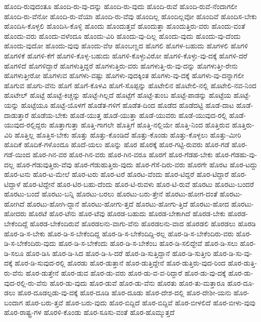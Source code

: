 {ಹೊಂದಿ-ರುವುದಂತೂ
ಹೊಂದಿ-ರು-ವು-ದನ್ನು
ಹೊಂದಿ-ರು-ವುದು
ಹೊಂದಿ-ರುವೆ
ಹೊಂದಿ-ರುವೆ-ನೆಂದಾಗಲೀ
ಹೊಂದಿ-ರು-ವೆನೋ
ಹೊಂದಿ-ರು-ವೆಯಾ
ಹೊಂದಿ-ರು-ವೆವು
ಹೊಂದಿಲ್ಲ
ಹೊಂದಿಲ್ಲವೋ
ಹೊಂದಿವೆ
ಹೊಂದಿಸ-ಬೇಕು
ಹೊಂದಿಸಿ-ಕೊಳ್ಳಲಿ
ಹೊಂದಿಸಿ-ಕೊಳ್ಳಿ
ಹೊಂದು
ಹೊಂದುತ್ತವೆ
ಹೊಂದುತ್ತಾ
ಹೊಂದುತ್ತಿರು-ವರು
ಹೊಂದು-ವಂತೆ
ಹೊಂದು-ವರು
ಹೊಂದು-ವಳೆಂದೂ
ಹೊಂದು-ವಿರಿ
ಹೊಂದು-ವು-ದಿಲ್ಲ
ಹೊಂದು-ವುದು
ಹೊಂದು-ವು-ದೆಂದು
ಹೊಂದು-ವುದೋ
ಹೊಂದು-ವುವು
ಹೊಂದು-ವೆಆ
ಹೊಂಬಣ್ಣದ
ಹೊಗಲಿ
ಹೊಗಳ-ಬಹುದು
ಹೊಗಳಲಿ
ಹೊಗಳಿ
ಹೊಗಳಿಕೆ
ಹೊಗಳಿ-ಕೆಗೆ
ಹೊಗಳಿ-ಕೊಳ್ಳ-ಬಹುದು
ಹೊಗಳಿ-ಕೊಳ್ಳುವಿರೋ
ಹೊಗಳಿ-ಕೊಳ್ಳು-ವು-ದಕ್ಕೆ
ಹೊಗಳಿ-ದರೆ
ಹೊಗಳಿದೆ
ಹೊಗಳಿದ್ದಾರೆ
ಹೊಗಳುತ್ತಿದ್ದರೆ
ಹೊಗಳುತ್ತಿರು-ವರು
ಹೊಗಳುತ್ತಿ-ರು-ವು-ದನ್ನು
ಹೊಗಳುತ್ತೀ-ರೇನು
ಹೊಗಳುತ್ತೀರೋ
ಹೊಗಳುವ
ಹೊಗಳು-ವಷ್ಟು
ಹೊಗಳು-ವುದಕ್ಕಿಂತ
ಹೊಗಳು-ವು-ದಕ್ಕೆ
ಹೊಗಳು-ವು-ದನ್ನಾಗಲೀ
ಹೊಗುವ
ಹೊಗು-ವೆನು
ಹೊಗೆ
ಹೊಗೆ-ಕೊಳವಿ
ಹೊಗೆ-ಸೊಪ್ಪನ್ನು
ಹೊಟೇಲಿನ
ಹೊಟೇಲಿ-ನಲ್ಲಿ
ಹೊಟೇಲಿ-ನವ-ನಿಂದ
ಹೊಟೇಲ್
ಹೊಟ್ಟೆ
ಹೊಟ್ಟೆ-ಕಿಚ್ಚನ್ನು
ಹೊಟ್ಟೆ-ಗಿಲ್ಲದೆ
ಹೊಟ್ಟೆಗೆ
ಹೊಟ್ಟೆ-ತುಂಬ
ಹೊಟ್ಟೆ-ಪಾಡನ್ನು
ಹೊಟ್ಟೆಯ
ಹೊಟ್ಟೆ-ಯನ್ನು
ಹೊಟ್ಟೆಯೂ
ಹೊಟ್ಟೆ-ಯೊಳಗೆ
ಹೊಡೆತ-ಗಳಿಗೆ
ಹೊಡೆತ-ದಿಂದ
ಹೊಡೆದ
ಹೊಡೆದಟ್ಟಿ
ಹೊಡೆ-ದಾಟ
ಹೊಡೆ-ದಾಡುತ್ತಾರೆ
ಹೊಡೆಯ-ಬೇಕು
ಹೊಡೆ-ಯುತ್ತ
ಹೊಡೆ-ಯುತ್ತಾ
ಹೊಡೆ-ಯುವರು
ಹೊಡೆ-ಯುವುದ-ರಲ್ಲಿ
ಹೊಡೆ-ಯುವುದ-ರಲ್ಲಿದ್ದರು
ಹೊತ್ತಾಗುತ್ತಾ
ಹೊತ್ತಿ-ಗಾಗಲೇ
ಹೊತ್ತಿಗೆ
ಹೊತ್ತಿ-ನಲ್ಲಿಯೇ
ಹೊತ್ತಿ-ನಿಂದ
ಹೊತ್ತಿರುವ
ಹೊತ್ತಿರು-ವಿರಿ
ಹೊತ್ತಿಲ್ಲ
ಹೊತ್ತಿಸ-ಬೇಕು
ಹೊತ್ತು
ಹೊತ್ತು-ಕೊಂಡಿದೆ
ಹೊತ್ತು-ಕೊಂಡು
ಹೊತ್ತು-ಕೊಳ್ಳಲು
ಹೊತ್ತು-ಮೀರಿ
ಹೊದಿಕೆ
ಹೊದಿಕೆ-ಗಳೊಂದೂ
ಹೊದೆ-ಯಲು
ಹೊನ್ನು
ಹೊರ
ಹೊರಕ್ಕೆ
ಹೊರ-ಗಟ್ಟಿ-ರುವರು
ಹೊರ-ಗಡೆ
ಹೊರ-ಗಡೆ-ಯಿಂದ
ಹೊರ-ಗಿನ-ವರ
ಹೊರ-ಗಿನ-ವರು
ಹೊರ-ಗಿನ-ವರೂ
ಹೊರಗೆ
ಹೊರ-ಗೆಡಹ-ಬೇಕು
ಹೊರ-ಗೆಡಹು-ವು-ದಲ್ಲ
ಹೊರ-ಗೆಡುವುತ್ತಿರು-ವೆವು
ಹೊರ-ಗೆಡುಹುತ್ತಿರು-ವುದು
ಹೊರ-ಗೆಸೆ-ದಿರು-ವರು
ಹೊರಗೇ
ಹೊರಟ
ಹೊರ-ಟದ್ದು
ಹೊರ-ಟನು
ಹೊರ-ಟ-ಮೇಲೆ
ಹೊರ-ಟರು
ಹೊರ-ಟರೆ
ಹೊರಟ-ವೆಂದು
ಹೊರ-ಟಿದ್ದರೆ
ಹೊರ-ಟಿದ್ದಾರೆ
ಹೊರ-ಟಿದ್ದಾಳೆ
ಹೊರ-ಟಿದ್ದೇನೆ
ಹೊರ-ಟಿರ-ಬಹು-ದೆಂದು
ಹೊರ-ಟಿ-ರುವಳು
ಹೊರ-ಟಿ-ರುವೆ
ಹೊರಟು
ಹೊರಟು-ಬಂದರೆ
ಹೊರಟು-ಬಂದೆ
ಹೊರಟು-ಬನ್ನಿ
ಹೊರಟು-ಬರಲು
ಹೊರಟು-ಬರು-ತ್ತೇನೆ
ಹೊರಟು-ಹೋಗ-ದಂತೆ
ಹೊರಟು-ಹೋಗಿದೆ
ಹೊರಟು-ಹೋಗಿ-ದ್ದಾನೆ
ಹೊರಟು-ಹೋಗು-ತ್ತದೆ
ಹೊರಟು-ಹೋಗು-ತ್ತಿದೆ
ಹೊರಟು-ಹೋದ
ಹೊರಟು-ಹೋದರು
ಹೊರಟೆ
ಹೊರ-ಟೆನು
ಹೊರ-ಟೆವು
ಹೊರಡ-ಬಹುದು
ಹೊರಡ-ಬೇಕಾಗಿದೆ
ಹೊರಡ-ಬೇಕು
ಹೊರಡ-ಬೇಕೆಂದಿದ್ದೆ
ಹೊರಡ-ಬೇಕೆಂದಿರುವೆ
ಹೊರಡಲನು-ವಾಗು-ವೆನು
ಹೊರಡಲನು-ವಾದ
ಹೊರಡಲಿ
ಹೊರಡಲು
ಹೊರಡಿ
ಹೊರ-ಡಿ-ಸ-ಬೇಕು
ಹೊರ-ಡಿ-ಸ-ಬೇಕೆಂದಿದ್ದ
ಹೊರ-ಡಿ-ಸ-ಬೇಕೆಂದಿದ್ದಿ-ರಲ್ಲ
ಹೊರ-ಡಿ-ಸ-ಬೇಕೆಂದಿರು-ವರು
ಹೊರ-ಡಿ-ಸ-ಬೇಕೆಂದಿರು-ವುದು
ಹೊರ-ಡಿ-ಸ-ಬೇಕೆಂದು
ಹೊರ-ಡಿ-ಸ-ಬೇಕೆಂಬ
ಹೊರ-ಡಿ-ಸಲಿದ್ದೇವೆ
ಹೊರ-ಡಿ-ಸಲು
ಹೊರ-ಡಿ-ಸಲೂ
ಹೊರ-ಡಿಸಿ
ಹೊರ-ಡಿ-ಸಿದ
ಹೊರ-ಡಿ-ಸಿ-ದರೆ
ಹೊರ-ಡಿ-ಸುತ್ತಿದ್ದಾನೆ
ಹೊರ-ಡಿ-ಸುತ್ತೀರಿ
ಹೊರ-ಡಿ-ಸು-ವು-ದಕ್ಕೆ
ಹೊರ-ಡಿ-ಸುವುದ-ರಲ್ಲಿ
ಹೊರಡು
ಹೊರ-ಡುತ್ತಾನೆ
ಹೊರ-ಡುತ್ತಿದ್ದೇನೆ
ಹೊರ-ಡುತ್ತಿರು-ವುದ-ರಿಂದ
ಹೊರ-ಡುತ್ತಿ-ರು-ವೆನು
ಹೊರ-ಡುತ್ತೇನೆ
ಹೊರ-ಡುವ
ಹೊರ-ಡು-ವರು
ಹೊರ-ಡು-ವ-ವ-ರಿದ್ದಾರೆ
ಹೊರ-ಡು-ವು-ದಕ್ಕೆ
ಹೊರ-ಡು-ವುದ-ರಲ್ಲಿ-ರು-ವೆನು
ಹೊರ-ಡು-ವುದು
ಹೊರ-ಡುವೆ
ಹೊರ-ಡು-ವೆನು
ಹೊರತು
ಹೊರ-ತು-ಮತ್ತಾರೂ
ಹೊರ-ದೂ-ಡಲು
ಹೊರ-ದೂಡಲ್ಪಡು-ವು-ದಕ್ಕೆ
ಹೊರ-ದೂಡಿ
ಹೊರ-ದೂಡು
ಹೊರ-ದೇಶ-ದಲ್ಲಿ
ಹೊರ-ದೇಶೀ-ಯನು
ಹೊರ-ಬಂದಾಗ
ಹೊರ-ಬರು-ತ್ತವೆ
ಹೊರ-ಬರು-ವುದು
ಹೊರ-ಬಿದ್ದಿದೆ
ಹೊರ-ಬಿದ್ದಿವೆ
ಹೊರ-ಬೀಳಲಿದೆ
ಹೊರ-ಬೀಳು-ವುವು
ಹೊರ-ರಾಷ್ಟ್ರ-ಗಳ
ಹೊರಳಿ-ಕೊಂಡು
ಹೊರ-ಸೂಸು-ವಂತೆ
ಹೊರ-ಹೊಮ್ಮುತ್ತದೆ
}
